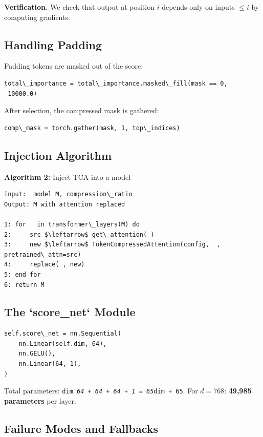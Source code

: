 \textbf{Verification.} We check that output at position $i$ depends only on 
inputs $\leq i$ by computing gradients.

\subsection{Handling Padding}

Padding tokens are masked out of the score:

\begin{lstlisting}
total\_importance = total\_importance.masked\_fill(mask == 0, -10000.0)
\end{lstlisting}

After selection, the compressed mask is gathered:

\begin{lstlisting}
comp\_mask = torch.gather(mask, 1, top\_indices)
\end{lstlisting}

\subsection{Injection Algorithm}

\textbf{Algorithm 2:} Inject TCA into a model
\begin{lstlisting}
Input:  model M, compression\_ratio  
Output: M with attention replaced

1: for   in transformer\_layers(M) do
2:     src $\leftarrow$ get\_attention( )
3:     new $\leftarrow$ TokenCompressedAttention(config,  , pretrained\_attn=src)
4:     replace( , new)
5: end for
6: return M
\end{lstlisting}

\subsection{The `score\_net` Module}

\begin{lstlisting}
self.score\_net = nn.Sequential(
    nn.Linear(self.dim, 64),
    nn.GELU(),
    nn.Linear(64, 1),
)
\end{lstlisting}

Total parameters: \texttt{dim \textit{ 64 + 64 + 64 + 1 = 65}dim + 65}. For $d = 768$: 
\textbf{49,985 parameters} per layer.

\subsection{Failure Modes and Fallbacks}

